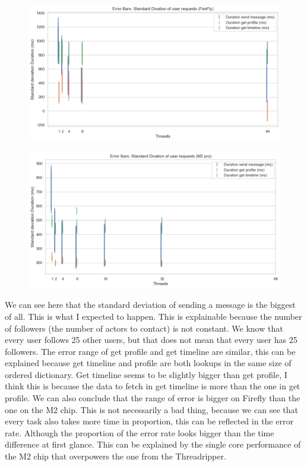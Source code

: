 \documentclass[a4paper]{article}
\begin{document}
\begin{figure}[H]
	\centering
	\includegraphics[width = \linewidth]{Images/SpeedupStdURFirefly.png}
	\caption{}
\end{figure}
\begin{figure}[H]
	\centering
	\includegraphics[width = \linewidth]{Images/SpeedupStdUR.png}
	\caption{}
\end{figure}
We can see here that the standard deviation of sending a message is the biggest of all.
This is what I expected to happen.
This is explainable because the number of followers (the number of actors to contact) is not constant. We know that every user follows 25 other users, but that does not mean that every user has 25 followers. The error range of get profile and get timeline are similar, this can be explained because get timeline and profile are both lookups in the same size of ordered dictionary. Get timeline seems to be slightly bigger than get profile, I think this is because the data to fetch in get timeline is more than the one in get profile. We can also conclude that the range of error is bigger on Firefly than the one on the M2 chip. This is not necessarily a bad thing, because we can see that every task also takes more time in proportion, this can be reflected in the error rate. Although the proportion of the error rate looks bigger than the time difference at first glance. This can be explained by the single core performance of the M2 chip that overpowers the one from the Threadripper.   
\end{document}
